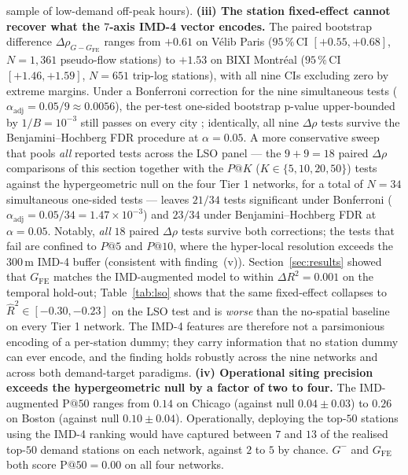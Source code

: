 \documentclass[11pt,a4paper]{article}
\begin{document}
sample of low-demand off-peak hours).
\textbf{(iii) The station fixed-effect cannot recover what the
$7$-axis IMD-4 vector encodes.}  The paired bootstrap difference
$\Delta\rho_{G - G_{\mathrm{FE}}}$ ranges from $+0.61$ on
V\'elib Paris ($95\,\%\,\mathrm{CI}$ $[+0.55, +0.68]$, $N = 1{,}361$
pseudo-flow stations) to $+1.53$ on BIXI Montr\'eal
($95\,\%\,\mathrm{CI}$ $[+1.46, +1.59]$, $N = 651$ trip-log
stations), with all nine CIs excluding zero by extreme margins.
Under a Bonferroni correction for the nine simultaneous tests
($\alpha_{\mathrm{adj}} = 0.05/9 \approx 0.0056$), the per-test
one-sided bootstrap p-value upper-bounded by $1/B = 10^{-3}$
still passes on every city ; identically, all nine $\Delta \rho$ tests
survive the Benjamini--Hochberg FDR procedure at $\alpha = 0.05$.
A more conservative sweep that pools \emph{all} reported tests
across the LSO panel — the $9 + 9 = 18$ paired $\Delta\rho$
comparisons of this section together with the
$P@K$ ($K \in \{5, 10, 20, 50\}$) tests against the
hypergeometric null on the four Tier 1 networks, for a total of
$N = 34$ simultaneous one-sided tests — leaves
$21/34$ tests significant under Bonferroni
($\alpha_{\mathrm{adj}} = 0.05/34 = 1.47 \times 10^{-3}$) and
$23/34$ under Benjamini--Hochberg FDR at $\alpha = 0.05$.
Notably, \emph{all} $18$ paired $\Delta\rho$ tests survive both
corrections; the tests that fail are confined to
$P@5$ and $P@10$, where the hyper-local resolution exceeds the
$300$\,m IMD-4 buffer (consistent with finding~(v)).
Section~\ref{sec:results} showed that $G_{\mathrm{FE}}$ matches
the IMD-augmented model to within $\Delta R^2 = 0.001$ on the
temporal hold-out; Table~\ref{tab:lso} shows that the same
fixed-effect collapses to $\hat{R}^2 \in [-0.30, -0.23]$ on the
LSO test and is \emph{worse} than the no-spatial baseline on
every Tier 1 network.  The IMD-4 features are therefore not a
parsimonious encoding of a per-station dummy; they carry
information that no station dummy can ever encode, and the
finding holds robustly across the nine networks and across both
demand-target paradigms.
\textbf{(iv) Operational siting precision exceeds the
hypergeometric null by a factor of two to four.}  The
IMD-augmented $\mathrm{P@}50$ ranges from $0.14$ on Chicago
(against null $0.04 \pm 0.03$) to $0.26$ on Boston (against null
$0.10 \pm 0.04$).  Operationally, deploying the top-$50$
stations using the IMD-4 ranking would have captured between
$7$ and $13$ of the realised top-$50$ demand stations on each
network, against $2$ to $5$ by chance.  $G^-$ and $G_{\mathrm{FE}}$
both score $\mathrm{P@}50 = 0.00$ on all four networks.
\end{document}
